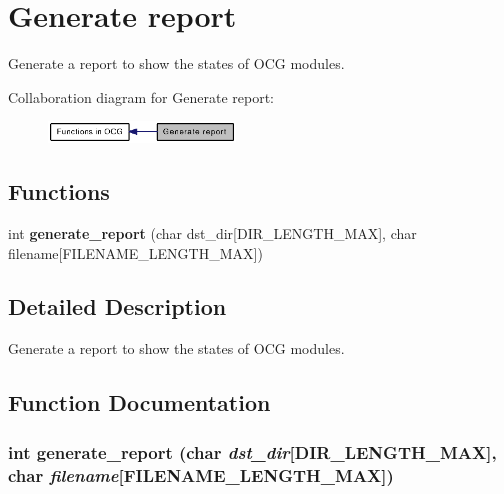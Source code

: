 \section{Generate report}
\label{group____generate__report}
Generate a report to show the states of OCG modules.  




Collaboration diagram for Generate report:\nopagebreak
\begin{figure}[H]
\begin{center}
\leavevmode
\includegraphics[width=141pt]{group____generate__report}
\end{center}
\end{figure}
\subsection*{Functions}
\begin{CompactItemize}
\item 
int {\bf generate\_\-report} (char dst\_\-dir[DIR\_\-LENGTH\_\-MAX], char filename[FILENAME\_\-LENGTH\_\-MAX])
\end{CompactItemize}


\subsection{Detailed Description}
Generate a report to show the states of OCG modules. 

\subsection{Function Documentation}
\subsubsection[{generate\_\-report}]{\setlength{\rightskip}{0pt plus 5cm}int generate\_\-report (char {\em dst\_\-dir}[DIR\_\-LENGTH\_\-MAX], \/  char {\em filename}[FILENAME\_\-LENGTH\_\-MAX])}\label{group____generate__report_gf2dd627644c186326cc894d6a8d11217}


